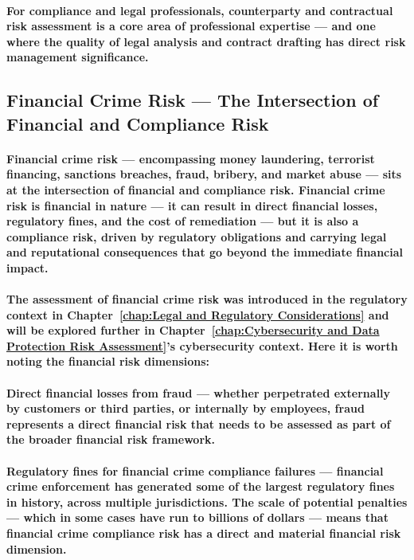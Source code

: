 \paragraph{For compliance and legal professionals, counterparty and contractual risk assessment is a core area of professional expertise — and one where the quality of legal analysis and contract drafting has direct risk management significance.}

\subsection{Financial Crime Risk — The Intersection of Financial and Compliance Risk}
\paragraph{\textbf{Financial crime risk} — encompassing money laundering, terrorist financing, sanctions breaches, fraud, bribery, and market abuse — sits at the intersection of financial and compliance risk. Financial crime risk is financial in nature — it can result in direct financial losses, regulatory fines, and the cost of remediation — but it is also a compliance risk, driven by regulatory obligations and carrying legal and reputational consequences that go beyond the immediate financial impact.}
\paragraph{The assessment of financial crime risk was introduced in the regulatory context in Chapter~\ref{chap:Legal and Regulatory Considerations} and will be explored further in Chapter~\ref{chap:Cybersecurity and Data Protection Risk Assessment}'s cybersecurity context. Here it is worth noting the financial risk dimensions:}
\paragraph{\textbf{Direct financial losses from fraud} — whether perpetrated externally by customers or third parties, or internally by employees, fraud represents a direct financial risk that needs to be assessed as part of the broader financial risk framework.}
\paragraph{\textbf{Regulatory fines for financial crime compliance failures} — financial crime enforcement has generated some of the largest regulatory fines in history, across multiple jurisdictions. The scale of potential penalties — which in some cases have run to billions of dollars — means that financial crime compliance risk has a direct and material financial risk dimension.}
